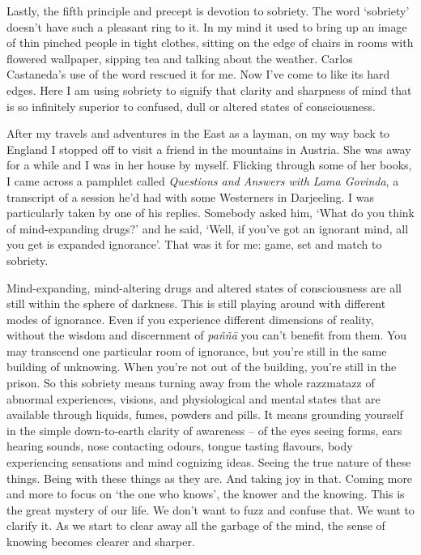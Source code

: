 Lastly, the fifth principle and precept is devotion to sobriety. The
word `sobriety' doesn't have such a pleasant ring to it. In my mind it
used to bring up an image of thin pinched people in tight clothes, 
sitting on the edge of chairs in rooms with flowered wallpaper, sipping
tea and talking about the weather. Carlos Castaneda's use of the word
rescued it for me. Now I've come to like its hard edges. Here I am using
sobriety to signify that clarity and sharpness of mind that is so
infinitely superior to confused, dull or altered states of
consciousness. 

After my travels and adventures in the East as a layman, on my way back
to England I stopped off to visit a friend in the mountains in Austria. 
She was away for a while and I was in her house by myself. Flicking
through some of her books, I came across a pamphlet called
\emph{Questions and Answers with Lama Govinda}, a transcript of a
session he'd had with some Westerners in Darjeeling. I was particularly
taken by one of his replies. Somebody asked him, `What do you think of
mind-expanding drugs?' and he said, `Well, if you've got an ignorant
mind, all you get is expanded ignorance'. That was it for me: game, set
and match to sobriety. 

Mind-expanding, mind-altering drugs and altered states of consciousness
are all still within the sphere of darkness. This is still playing
around with different modes of ignorance. Even if you experience
different dimensions of reality, without the wisdom and discernment of
\emph{paññā} you can't benefit from them. You may transcend one
particular room of ignorance, but you're still in the same building of
unknowing. When you're not out of the building, you're still in the
prison. So this sobriety means turning away from the whole razzmatazz of
abnormal experiences, visions, and physiological and mental states that
are available through liquids, fumes, powders and pills. It means
grounding yourself in the simple down-to-earth clarity of awareness --
of the eyes seeing forms, ears hearing sounds, nose contacting odours, 
tongue tasting flavours, body experiencing sensations and mind cognizing
ideas. Seeing the true nature of these things. Being with these things
as they are. And taking joy in that. Coming more and more to focus on
`the one who knows', the
knower and the knowing. This is the great mystery of our life. We don't
want to fuzz and confuse that. We want to clarify it. As we start to
clear away all the garbage of the mind, the sense of knowing becomes
clearer and sharper. 

